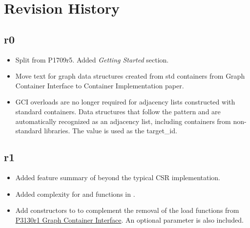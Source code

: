 \section{Revision History}

\subsection*{\paperno r0}

\begin{itemize}
      \item Split from P1709r5. Added \textit{Getting Started} section.
      \item Move text for graph data structures created from std containers from Graph Container Interface to 
            Container Implementation paper.
      \item GCI overloads are no longer required for adjacency lists constructed with standard containers. Data structures that follow
            the pattern  and 
            are automatically recognized as an adjacency list, including containers from non-standard libraries. The 
            value is used as the target\_id.
\end{itemize}

\subsection*{\paperno r1}
\begin{itemize}
      \item Added feature summary of  beyond the typical CSR implementation.
      \item Added complexity for  and  functions in .
      \item Add constructors to  to complement the removal of the load functions from 
            \href{https://www.wg21.link/P3130r1}{P3130r1 Graph Container Interface}. An optional  
            parameter is also included.
\end{itemize}
